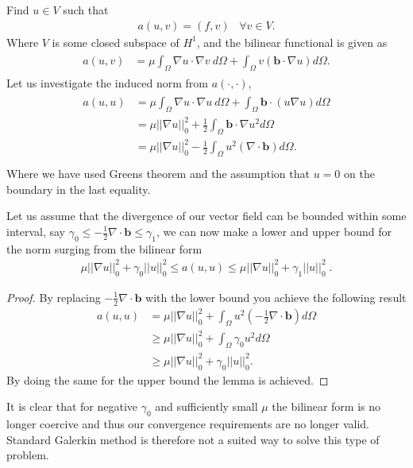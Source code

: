 Find $u \in V$ such that
%
\begin{align}
	a(u,v) = (f,v) \; \; \; \forall v \in V.
	\label{eq:varFormDiffFEM}
\end{align}
%
Where $V$ is some closed subspace of $H^1$, and the bilinear functional is given as 
%
\begin{align}
	\begin{split}
	a(u,v) &= \mu\int_{\Omega}\nabla u \cdot \nabla v \: d\Omega 
	+ \int_{\Omega} v (\mathbf{b} \cdot \nabla u) d \Omega.
	\end{split}
	\label{eq:bilinearFunctional}
\end{align}
%
Let us investigate the induced norm from $a(\cdot,\cdot)$, 
%
\begin{align}
\begin{split}
	a(u,u) &= \mu\int_{\Omega}\nabla u \cdot \nabla u \: d\Omega 
	+ \int_{\Omega}  \mathbf{b} \cdot (u\nabla u) d \Omega\\
	       &= \mu||\nabla u||^2_0 
	+ \frac{1}{2}\int_{\Omega} \mathbf{b} \cdot \nabla u^2 d \Omega \\
	       &= \mu||\nabla u||^2_0 
	- \frac{1}{2}\int_{\Omega} u^2  (\nabla \cdot \mathbf{b})  d \Omega. \\
\end{split}
	\label{eq:bilinearFunctional}
\end{align}
%
Where we have used Greens theorem and the assumption that $u=0$ on the boundary in the last equality. 

\begin{lemma}
Let us assume that the divergence of our vector field can be bounded within some interval, say  $\gamma_0 \leq -\frac{1}{2}\nabla \cdot \mathbf{b} \leq \gamma_1 $, we can now make a lower and upper bound for the norm surging from the bilinear form 
%
\begin{align}
	\mu||\nabla u||^2_0 + \gamma_0||u||^2_0 \leq a(u,u) \leq \mu||\nabla u||^2_0 + \gamma_1||u||^2_0\; .
	\label{eq:bilinearOperatorBounds}
\end{align}
%
\end{lemma}
%
\begin{proof}
By replacing $-\frac{1}{2}\nabla \cdot \mathbf{b} $ with the lower bound you achieve the following result
\begin{align}
 a(u,u) &= \mu||\nabla u||^2_0 +
	\int_{\Omega} u^2 (- \frac{1}{2}\nabla \cdot \mathbf{b}) d \Omega \\
	&\geq \mu||\nabla u||^2_0 
	+ \int_{\Omega} \gamma_0 u^2 d \Omega \\
	&\geq \mu||\nabla u||^2_0 
	+ \gamma_0|| u||_0^2.
	\label{eq:proof}
\end{align}
By doing the same for the upper bound the lemma is achieved.
\end{proof}
It is clear that for negative $\gamma_0$ and sufficiently small $\mu$ the bilinear form is no longer coercive and thus our convergence requirements are no longer valid. Standard Galerkin method is therefore not a suited way to solve this type of problem. 
%
%
